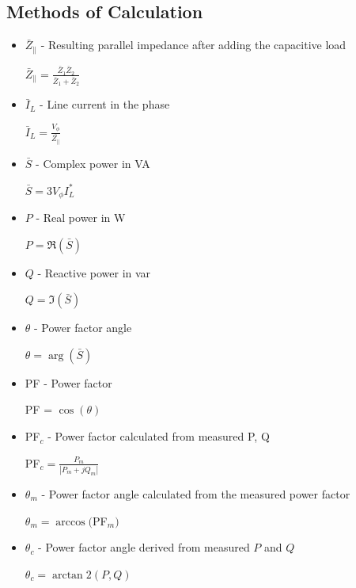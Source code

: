 \subsection{Methods of Calculation}
\begin{itemize}
  \item $\bar{Z}_\|$ - Resulting parallel impedance after adding the
    capacitive load
    \begin{center}
      $\bar{Z}_{\|} = \frac{
        \bar{Z}_{1}\bar{Z}_{2}
      }{
        \bar{Z}_1 + \bar{Z}_2
      }$
    \end{center}

  \item $\bar{I}_L$ - Line current in the phase
    \begin{center}
      $\bar{I}_{L} = \frac{
        V_{\phi}
      }{
        \bar{Z_{\|}}
      }$
    \end{center}

  \item $\bar{S}$ - Complex power in VA
    \begin{center}
      $\bar{S} = 3V_{\phi}I_{L}^*$
    \end{center}

  \item $P$ - Real power in W
    \begin{center}
      $P = \Re(\bar{S})$
    \end{center}

  \item $Q$ - Reactive power in var
    \begin{center}
      $Q = \Im(\bar{S})$
    \end{center}

  \item $\theta$ - Power factor angle
    \begin{center}
      $\theta = \arg(\bar{S})$
    \end{center}

  \item PF - Power factor
    \begin{center}
      PF = $\cos(\theta)$
    \end{center}

  \item PF$_{c}$ - Power factor calculated from measured P, Q
    \begin{center}
      PF$_{c}  = \frac{
        P_{m}
      }{
        |P_{m} + jQ_{m}|
      }$
    \end{center}

  \item $\theta_{m}$ - Power factor angle calculated from the
    measured power factor
    \begin{center}
      $\theta_{m} = \arccos($PF$_{m})$
    \end{center}

  \item
    $\theta_{c}$ - Power factor angle derived from measured $P$ and $Q$
    \begin{center}
      $\theta_{c} = \arctan2(P, Q)$
    \end{center}

\end{itemize}

\clearpage
